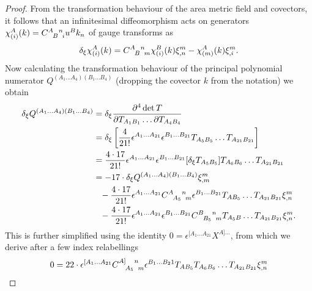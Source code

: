 \begin{proof}
  From the transformation behaviour of the area metric field and covectors, it follows that an infinitesimal diffeomorphism acts on generators $\chi^A_{(i)}(k) = \gmc{A}{B}{n}{i} u^B k_n$ of gauge transforms as
  \begin{equation}
    \delta_\xi \chi^A_{(i)}(k) = \gmc{A}{B}{n}{m} \chi^B_{(i)}(k) \xi^m_{,n} - \chi^A_{(m)}(k)\xi^m_{,i}.
  \end{equation}
  Now calculating the transformation behaviour of the principal polynomial numerator $Q^{(A_1\dots A_4)(B_1\dots B_4)}$ (dropping the covector $k$ from the notation) we obtain
  \begin{equation}\label{Q_trafo}
    \begin{aligned}
      \delta_\xi Q^{(A_1\dots A_4)(B_1\dots B_4)} &{} = \delta_\xi \frac{\partial^4 \operatorname{det} T}{\partial T_{A_1B_1}\dots\partial T_{A_4B_4}} \\
                                                  &{} = \delta_\xi \left\lbrack \frac{4}{21!} \epsilon^{A_1\dots A_{21}} \epsilon^{B_1\dots B_{21}} T_{A_5B_5} \dots T_{A_{21}B_{21}}\right\rbrack \\
                                                  &{} = \frac{4\cdot 17}{21!} \epsilon^{A_1\dots A_{21}} \epsilon^{B_1\dots B_{21}} \lbrack\delta_\xi T_{A_5B_5}\rbrack T_{A_6B_6}\dots T_{A_{21}B_{21}} \\
                                                  &{} = -17\cdot \delta_\xi Q^{(A_1\dots A_4)(B_1\dots B_4)} \xi^m_{,m} \\
                                                  &{} \hphantom{=} -\frac{4\cdot 17}{21!} \epsilon^{A_1\dots A_{21}} \gmc{A}{A_5}{n}{m} \epsilon^{B_1\dots B_{21}} T_{AB_5} \dots T_{A_{21}B_{21}} \xi^m_{,n} \\
                                                  &{} \hphantom{=} -\frac{4\cdot 17}{21!} \epsilon^{A_1\dots A_{21}} \epsilon^{B_1\dots B_{21}} \gmc{B}{B_5}{n}{m} T_{A_5B} \dots T_{A_{21}B_{21}} \xi^m_{,n}.
    \end{aligned}
  \end{equation}
  This is further simplified using the identity $0 = \epsilon^{\lbrack A_1\dots A_{21}} X^{A\rbrack\dots}$, from which we derive after a few index relabellings
  \begin{equation}
    \begin{aligned}
      0 &{} = 22 \cdot \epsilon^{\lbrack A_1\dots A_{21}} \gmc{A\rbrack}{A_5}{n}{m} \epsilon^{B_1\dots B_21} T_{AB_5}T_{A_6B_6}\dots T_{A_{21}B_{21}} \xi^m_{,n} \\

\end{aligned}
\end{equation}
\end{proof}
